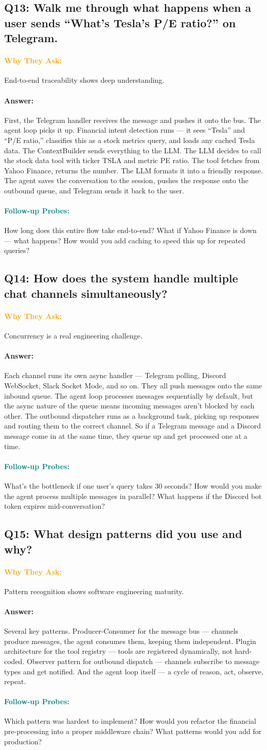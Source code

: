 \documentclass[11pt,a4paper]{article}
\newcommand{\Q}[1]{\subsection{#1}}
\newcommand{\Ans}[1]{\paragraph{\textbf{Answer:}} #1}
\newcommand{\Why}{\paragraph{\textcolor{orange}{\textbf{Why They Ask:}}}}
\newcommand{\Probe}{\paragraph{\textcolor{teal}{\textbf{Follow-up Probes:}}}}
\begin{document}
\Q{Q13: Walk me through what happens when a user sends ``What's Tesla's P/E ratio?'' on Telegram.}
\Why End-to-end traceability shows deep understanding.
\Ans First, the Telegram handler receives the message and pushes it onto the bus. The agent loop picks it up. Financial intent detection runs --- it sees ``Tesla'' and ``P/E ratio,'' classifies this as a stock metrics query, and loads any cached Tesla data. The ContextBuilder sends everything to the LLM. The LLM decides to call the stock data tool with ticker TSLA and metric PE ratio. The tool fetches from Yahoo Finance, returns the number. The LLM formats it into a friendly response. The agent saves the conversation to the session, pushes the response onto the outbound queue, and Telegram sends it back to the user.
\Probe How long does this entire flow take end-to-end? What if Yahoo Finance is down --- what happens? How would you add caching to speed this up for repeated queries?

\Q{Q14: How does the system handle multiple chat channels simultaneously?}
\Why Concurrency is a real engineering challenge.
\Ans Each channel runs its own async handler --- Telegram polling, Discord WebSocket, Slack Socket Mode, and so on. They all push messages onto the same inbound queue. The agent loop processes messages sequentially by default, but the async nature of the queue means incoming messages aren't blocked by each other. The outbound dispatcher runs as a background task, picking up responses and routing them to the correct channel. So if a Telegram message and a Discord message come in at the same time, they queue up and get processed one at a time.
\Probe What's the bottleneck if one user's query takes 30 seconds? How would you make the agent process multiple messages in parallel? What happens if the Discord bot token expires mid-conversation?

\Q{Q15: What design patterns did you use and why?}
\Why Pattern recognition shows software engineering maturity.
\Ans Several key patterns. Producer-Consumer for the message bus --- channels produce messages, the agent consumes them, keeping them independent. Plugin architecture for the tool registry --- tools are registered dynamically, not hard-coded. Observer pattern for outbound dispatch --- channels subscribe to message types and get notified. And the agent loop itself --- a cycle of reason, act, observe, repeat.
\Probe Which pattern was hardest to implement? How would you refactor the financial pre-processing into a proper middleware chain? What patterns would you add for production?
\end{document}
